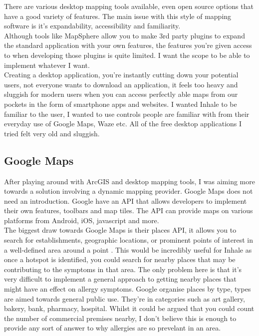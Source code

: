 There are various desktop mapping tools available, even open source options that have a good variety of features. The main issue with this style of mapping software is it's expandability, accessibility and familiarity.\\

Although tools like MapSphere allow you to make 3rd party plugins to expand the standard application with your own features, the features you're given access to when developing those plugins is quite limited. I want the scope to be able to implement whatever I want.\\

Creating a desktop application, you're instantly cutting down your potential users, not everyone wants to download an application, it feels too heavy and sluggish for modern users when you can access perfectly able maps from our pockets in the form of smartphone apps and websites. I wanted Inhale to be familiar to the user, I wanted to use controls people are familiar with from their everyday use of Google Maps, Waze etc. All of the free desktop applications I tried felt very old and sluggish.\\

\subsection{Google Maps}

After playing around with ArcGIS and desktop mapping tools, I was aiming more towards a solution involving a dynamic mapping provider. Google Maps does not need an introduction. Google have an API that allows developers to implement their own features, toolbars and map tiles. The API can provide maps on various platforms from Android, iOS, javascript and more.\\

The biggest draw towards Google Maps is their places API, it allows you to search for establishments, geographic locations, or prominent points of interest in a well-defined area around a point \cite{googlePlaces}. This would be incredibly useful for Inhale as once a hotspot is identified, you could search for nearby places that may be contributing to the symptoms in that area. The only problem here is that it's very difficult to implement a general approach to getting nearby places that might have an effect on allergy symptoms. Google organise places by type, types are aimed towards general public use. They're in categories such as art gallery, bakery, bank, pharmacy, hospital. Whilst it could be argued that you could count the number of commercial premises nearby, I don't believe this is enough to provide any sort of answer to why allergies are so prevelant in an area.\\

